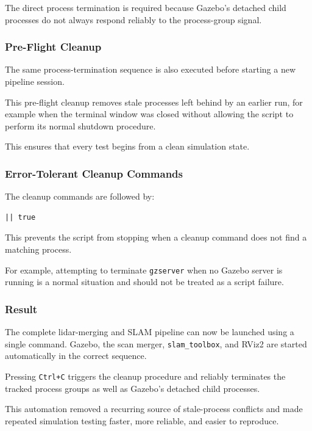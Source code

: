 \documentclass{article}
\begin{document}
The direct process termination is required because Gazebo's detached child processes do not always respond reliably to the process-group signal.

\subsubsection{Pre-Flight Cleanup}

The same process-termination sequence is also executed before starting a new pipeline session.

This pre-flight cleanup removes stale processes left behind by an earlier run, for example when the terminal window was closed without allowing the script to perform its normal shutdown procedure.

This ensures that every test begins from a clean simulation state.

\subsubsection{Error-Tolerant Cleanup Commands}

The cleanup commands are followed by:

\begin{verbatim}
|| true
\end{verbatim}

This prevents the script from stopping when a cleanup command does not find a matching process.

For example, attempting to terminate \texttt{gzserver} when no Gazebo server is running is a normal situation and should not be treated as a script failure.

\subsubsection{Result}

The complete lidar-merging and SLAM pipeline can now be launched using a single command. Gazebo, the scan merger, \texttt{slam\_toolbox}, and RViz2 are started automatically in the correct sequence.

Pressing \texttt{Ctrl+C} triggers the cleanup procedure and reliably terminates the tracked process groups as well as Gazebo's detached child processes.

This automation removed a recurring source of stale-process conflicts and made repeated simulation testing faster, more reliable, and easier to reproduce.
\end{document}

